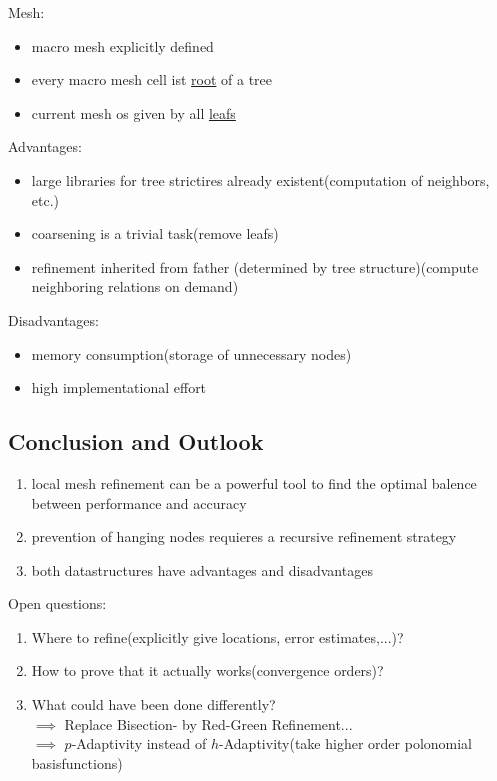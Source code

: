 Mesh:
\begin{itemize}
	\item macro mesh explicitly defined
	\item every macro mesh cell ist \underline{root} of a tree
	\item current mesh os given by all \underline{leafs}
\end{itemize}

Advantages:
\begin{itemize}
	\item large libraries for tree strictires already existent(computation of neighbors, etc.)
	\item coarsening is a trivial task(remove leafs)
	\item refinement inherited from father (determined by tree structure)(compute neighboring relations \glqq on demand\grqq)
\end{itemize}

Disadvantages:
\begin{itemize}
	\item memory consumption(storage of unnecessary nodes)
	\item high implementational effort
\end{itemize}

\subsection{Conclusion and Outlook}
\begin{enumerate}[label = \arabic* .]
	\item local mesh refinement can be a powerful tool to find the optimal balence between performance and accuracy
	\item prevention of hanging nodes requieres a recursive refinement strategy
	\item both datastructures have advantages and disadvantages  
\end{enumerate}
Open questions:
\begin{enumerate}[label = \arabic* .]
	\item Where to refine(explicitly give locations, error estimates,...)?
	\item How to prove that it actually works(convergence orders)?
	\item What could have been done differently?\\
	$\implies$ Replace Bisection- by Red-Green Refinement...\\
	$\implies$ $p$-Adaptivity instead of $h$-Adaptivity(take higher order polonomial basisfunctions)
\end{enumerate}


